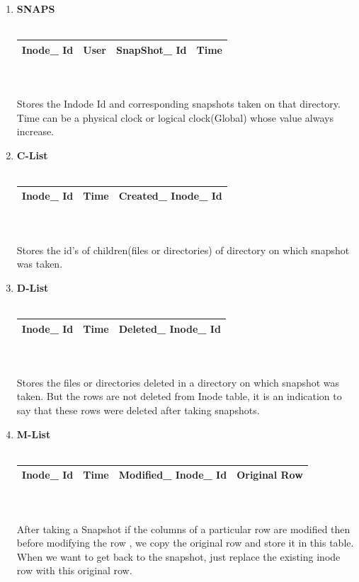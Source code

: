 \begin{enumerate}
\item \textbf{SNAPS}\\\\
\begin{tabular}{|c|c|c|c|}
\hline
Inode\_ Id&
User&
SnapShot\_ Id&
Time\\
\hline
\end{tabular}\\\\
Stores the Indode Id and corresponding snapshots taken on that directory. Time can be a physical clock or logical clock(Global) whose value always increase.

\item \textbf{C-List}\\\\
\begin{tabular}{|c|c|c|}
\hline
Inode\_ Id&
Time&
Created\_ Inode\_ Id\\
\hline
\end{tabular}\\\\
Stores the id's of children(files or directories) of directory on which snapshot was taken.



\item \textbf{D-List}\\\\
\begin{tabular}{|c|c|c|}
\hline
Inode\_ Id&
Time&
Deleted\_ Inode\_ Id\\
\hline
\end{tabular}\\\\
Stores the  files or directories  deleted in a directory on which snapshot was taken. But the rows are not deleted from Inode table, it is an indication to say that these rows were deleted after taking snapshots.

\item \textbf{M-List}\\\\
\begin{tabular}{|c|c|c|c|}
\hline
Inode\_ Id&
Time&
Modified\_ Inode\_ Id&
Original Row\\
\hline
\end{tabular}\\\\
After taking a Snapshot if the columns of a particular row are modified then before modifying the row , we copy the original row and store it in this table. When we want to get back to the snapshot, just replace the existing inode row with this original row.


\end{enumerate}
